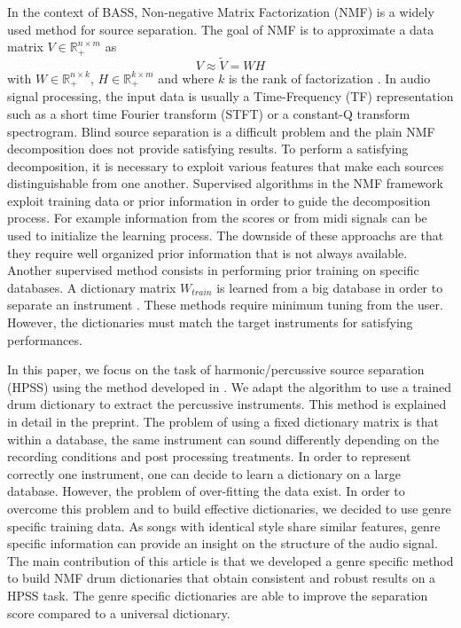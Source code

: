 \documentclass{article}
\begin{document}
In the context of BASS, Non-negative Matrix Factorization (NMF) is a widely used method for source separation. The goal of NMF is to approximate a data matrix $V \in \mathbb{R}_{+}^{n \times m} $ as 
\begin{equation}\label{modelNMF}
V \approx \tilde{V} = WH
\end{equation}
with $W \in \mathbb{R}_{+}^{n \times k}$, $H \in \mathbb{R}_{+}^{k \times m}$ and where $k$ is the rank of factorization \cite{lee99}. In audio signal processing, the input data is usually a Time-Frequency (TF) representation such as a short time Fourier transform (STFT) or a constant-Q transform spectrogram. Blind source separation is a difficult problem and the plain NMF decomposition does not provide satisfying results. To perform a satisfying decomposition, it is necessary to exploit various features that make each sources distinguishable from one another. 
Supervised algorithms in the NMF framework exploit training data or prior information in order to guide the decomposition process. For example information from the scores or from midi signals \cite{EwertM12} can be used to initialize the learning process. The downside of these approachs are that they require well organized prior information that is not always available. Another supervised method consists in performing prior training on specific databases. A dictionary matrix $W_{train}$ is learned from a big database in order to separate an instrument \cite{jaureguiberry2011adaptation,wudrum}. These methods require minimum tuning from the user. However, the dictionaries must match the target instruments for satisfying performances. 


In this paper, we focus on the task of harmonic/percussive source separation (HPSS) using the method developed in \cite{laroche2015structured}. We adapt the algorithm to use a trained drum dictionary to extract the percussive instruments. This method is explained in detail in the preprint. 
The problem of using a fixed dictionary matrix is that within a database, the same instrument can sound differently depending on the recording conditions and post processing treatments. In order to represent correctly one instrument, one can decide to learn a dictionary on a large database. However, the problem of over-fitting the data exist. In order to overcome this problem and to build effective dictionaries, we decided to use genre specific training data. As songs with identical style share similar features, genre specific information can provide an insight on the structure of the audio signal.
The main contribution of this article is that we developed a genre specific method to build NMF drum dictionaries that obtain consistent and robust results on a HPSS task. The genre specific dictionaries are able to improve the separation score compared to a universal dictionary. 
 
\end{document}
